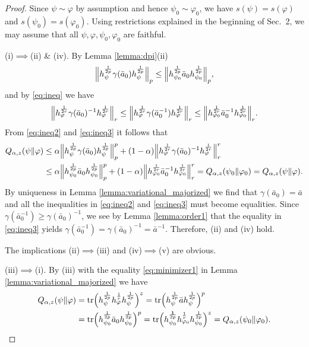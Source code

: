 \documentclass[12pt]{article}
\theoremstyle{definition}
\theoremstyle{remark}
\numberwithin{equation}{section}
\def\Tr{\mathrm{tr}}
\def\ffi{\varphi}
\def\1{\mathbf{1}}
\begin{document}
\begin{proof}
{\color{red}Since $\psi\sim\ffi$ by assumption and hence $\psi_0\sim \ffi_0$, we have
$s(\psi)=s(\ffi)$ and $s(\psi_0)=s(\ffi_0)$.} Using restrictions {\color{red}explained in the beginning
of Sec.~2}, we may assume that all $\psi,\ffi,\psi_0,\ffi_0$ are faithful.

(i)$\implies$(ii) \& (iv).\enspace
By Lemma \ref{lemma:dpi}(ii)
\begin{align}
\Big\|h_\psi^{1\over2p}\gamma(\bar a_0)h_\psi^{1\over2p}\Big\|_{p}
\le\Big\|h_{\psi_0}^{1\over2p}\bar a_0h_{\psi_0}^{1\over2p}\Big\|_{p},
\label{eq:ineq2}
\end{align}
and by \eqref{eq:ineq} we have
\begin{align}
\Big\|h_\ffi^{1\over2r}\gamma(\bar a_0)^{-1}h_\ffi^{1\over2r}\Big\|_{r}
\le\Big\|h_\ffi^{1\over2r}\gamma(\bar a_0^{-1})h_\ffi^{1\over2r}\Big\|_{r}
\le\Big\|h_{\ffi_0}^{1\over2r}\bar
a_0^{-1}h_{\ffi_0}^{1\over2r}\Big\|_{r}. \label{eq:ineq3}
\end{align}
From \eqref{eq:ineq2} and \eqref{eq:ineq3} it follows that
\begin{align*}
Q_{\alpha,z}(\psi\|\ffi)&\le \alpha\Big\|h_\psi^{1\over2p}\gamma(\bar
a_0)h_\psi^{1\over2p}\Big\|^p_{p}
+(1-\alpha)\Big\|h_\ffi^{1\over2r}\gamma(\bar a_0)^{-1}h_\ffi^{1\over2r}\Big\|^r_{r} \\
&\le\alpha\Big\|h_{\psi_0}^{1\over2p}\bar a_0h_{\psi_0}^{1\over2p}\Big\|^p_{p}
+(1-\alpha)\Big\|h_{\ffi_0}^{1\over2r}\bar a_0^{-1}h_{\ffi_0}^{1\over2r}\Big\|^r_{r}
=Q_{\alpha,z}(\psi_0\|\ffi_0)=Q_{\alpha,z}(\psi\|\ffi).
\end{align*}
By uniqueness in Lemma \ref{lemma:variational_majorized} we find that $\gamma(\bar
a_0)=\bar a$ and all the inequalities in \eqref{eq:ineq2} and \eqref{eq:ineq3} must
become equalities. Since $\gamma(\bar a_0^{-1})\ge\gamma(\bar a_0)^{-1}$, we see by
Lemma \ref{lemma:order1} that the equality in
\eqref{eq:ineq3} yields $\gamma(\bar a_0^{-1})=\gamma(\bar a_0)^{-1}=\bar a^{-1}$. Therefore,
(ii) and (iv) hold.

The implications (ii)$\implies$(iii) and (iv)$\implies$(v) are obvious.

(iii)$\implies$(i).\enspace
By (iii) with the equality \eqref{eq:minimizer1} in Lemma \ref{lemma:variational_majorized} we have
\begin{align*}
Q_{\alpha,z}(\psi\|\ffi)
&=\Tr\Bigl(h_\psi^{1\over2p}h_\ffi^{1\over r}h_\psi^{1\over2p}\Bigr)^z
=\Tr\Bigl(h_\psi^{1\over2p}\bar ah_\psi^{1\over2p}\Bigr)^{p} \\
&=\Tr\Bigl(h_{\psi_0}^{1\over2p}\bar a_0h_{\psi_0}^{1\over2p}\Bigr)^{p}
=\Tr\Bigl(h_{\psi_0}^{\1\over2p}h_{\ffi_0}^{1\over r}h_{\psi_0}^{1\over2p}\Bigr)^z
=Q_{\alpha,z}(\psi_0\|\ffi_0).
\end{align*}


\end{proof}
\end{document}
